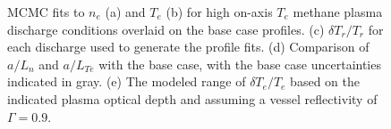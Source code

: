 \documentclass[%
 aip,
 amsmath,amssymb,
 reprint,%
]{revtex4-1}
\begin{document}
\begin{figure}[!htbp]
\begin{subfigure}[]{.45\textwidth}
\end{subfigure}
\hfill
\begin{subfigure}[]{.45\textwidth}
  \centering

\end{subfigure}

\caption{MCMC fits to $n_e$ (a) and $T_e$ (b) for high on-axis $T_e$ methane plasma discharge conditions overlaid on the base case profiles. (c) $\delta T_r /T_r$ for each discharge used to generate the profile fits. (d) Comparison of $a/L_n$ and $a/L_{Te}$ with the base case, with the base case uncertainties indicated in gray. (e) The modeled range of $\delta T_e/T_e$  based on the indicated plasma optical depth and assuming a vessel reflectivity of $\Gamma=0.9$.}
\label{fig:methane_fluc_summary}
\end{figure}
\end{document}
